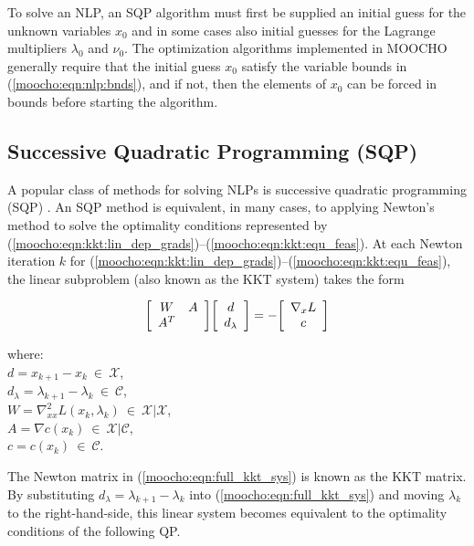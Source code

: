 \documentclass[pdf,12pt,report]{SANDreport}
\begin{document}
To solve an NLP, an SQP algorithm must first be supplied an initial guess for
the unknown variables $x_0$ and in some cases also initial guesses for the
Lagrange multipliers $\lambda_0$ and $\nu_0$.  The optimization algorithms
implemented in MOOCHO generally require that the initial guess $x_0$ satisfy
the variable bounds in (\ref{moocho:eqn:nlp:bnds}), and if not, then the
elements of $x_0$ can be forced in bounds before starting the algorithm.

%
\subsection{Successive Quadratic Programming (SQP)}
\label{moocho:sec:SQP}
%

A popular class of methods for solving NLPs is successive quadratic
programming (SQP) {}\cite{ref:boggs_tolle_1996}.  An SQP method is
equivalent, in many cases, to applying Newton's method to solve the
optimality conditions represented by
(\ref{moocho:eqn:kkt:lin_dep_grads})--(\ref{moocho:eqn:kkt:equ_feas}).
At each Newton iteration $k$ for
(\ref{moocho:eqn:kkt:lin_dep_grads})--(\ref{moocho:eqn:kkt:equ_feas}),
the linear subproblem (also known as the KKT system) takes the form

{\bsinglespace
\begin{equation}
{\bmat{cc}
	W    & A \\
	A^T  &
\emat}
{\bmat{c}
	d \\
	d_{\lambda}
\emat}
=
-
{\bmat{c}
	\nabla_x L \\
	c
\emat}
\label{moocho:eqn:full_kkt_sys}
\end{equation}
\begin{tabbing}
\hspace{4ex}where:\hspace{5ex}\= \\
\>	$d = x_{k+1} - x_k \:\in\:\mathcal{X}$, \\
\>	$d_{\lambda} = \lambda_{k+1} - \lambda_k \:\in\:\mathcal{C}$, \\
\>	$W = \nabla_{xx}^2 L(x_k,\lambda_k) \:\in\:\mathcal{X}|\mathcal{X}$, \\
\>	$A = \nabla c(x_k) \:\in\:\mathcal{X}|\mathcal{C}$, \\
\>	$c = c(x_k) \:\in\:\mathcal{C}$.
\end{tabbing}
\esinglespace}

The Newton matrix in (\ref{moocho:eqn:full_kkt_sys}) is known as the KKT
matrix.  By substituting $d_{\lambda} = {}\lambda_{k+1} - {}\lambda_k$ into
(\ref{moocho:eqn:full_kkt_sys}) and moving ${}\lambda_k$ to the
right-hand-side, this linear system becomes equivalent to the optimality
conditions of the following QP.
\end{document}
